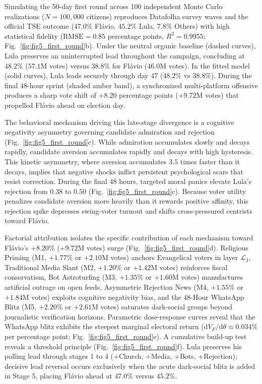 \documentclass[a4paper,fleqn]{cas-dc}
\begin{document}
Simulating the 50-day first round across 100 independent Monte Carlo realizations ($N = 100{,}000$ citizens) reproduces Datafolha survey waves and the official TSE outcome ($47.0\%$ Flávio, $45.2\%$ Lula, $7.8\%$ Others) with high statistical fidelity ($\mathrm{RMSE} = 0.85$ percentage points, $R^2 = 0.9955$; Fig.~\ref{fig:fig5_first_round}b). Under the neutral organic baseline (dashed curves), Lula preserves an uninterrupted lead throughout the campaign, concluding at $48.2\%$ ($57.1\mathrm{M}$ votes) versus $38.8\%$ for Flávio ($46.0\mathrm{M}$ votes). In the fitted model (solid curves), Lula leads securely through day 47 ($48.2\%$ vs $38.8\%$). During the final 48-hour sprint (shaded amber band), a synchronized multi-platform offensive produces a sharp vote shift of $+8.20$ percentage points ($+9.72\mathrm{M}$ votes) that propelled Flávio ahead on election day.

The behavioral mechanism driving this late-stage divergence is a cognitive negativity asymmetry governing candidate admiration and rejection (Fig.~\ref{fig:fig5_first_round}c). While admiration accumulates slowly and decays rapidly, candidate aversion accumulates rapidly and decays with high hysteresis. This kinetic asymmetry, where aversion accumulates $3.5$ times faster than it decays, implies that negative shocks inflict persistent psychological scars that resist correction. During the final 48 hours, targeted moral panics elevate Lula's rejection from $0.38$ to $0.50$ (Fig.~\ref{fig:fig5_first_round}c). Because voter utility penalizes candidate aversion more heavily than it rewards positive affinity, this rejection spike depresses swing-voter turnout and shifts cross-pressured centrists toward Flávio.

Factorial attribution isolates the specific contribution of each mechanism toward Flávio's $+8.20\%$ ($+9.72\mathrm{M}$ votes) surge (Fig.~\ref{fig:fig5_first_round}d). Religious Priming (M1, $+1.77\%$ or $+2.10\mathrm{M}$ votes) anchors Evangelical voters in layer $\mathcal{L}_3$, Traditional Media Slant (M2, $+1.20\%$ or $+1.42\mathrm{M}$ votes) reinforces fiscal conservatism, Bot Astroturfing (M3, $+1.35\%$ or $+1.60\mathrm{M}$ votes) manufactures artificial outrage on open feeds, Asymmetric Rejection News (M4, $+1.55\%$ or $+1.84\mathrm{M}$ votes) exploits cognitive negativity bias, and the 48-Hour WhatsApp Blitz (M5, $+2.20\%$ or $+2.61\mathrm{M}$ votes) saturates dark-social groups beyond journalistic verification horizons. Parametric dose-response curves reveal that the WhatsApp blitz exhibits the steepest marginal electoral return ($\mathrm{d}V_F/\mathrm{d}\theta \approx 0.034\%$ per percentage point; Fig.~\ref{fig:fig5_first_round}e). A cumulative build-up test reveals a threshold principle (Fig.~\ref{fig:fig5_first_round}f). Lula preserves his polling lead through stages 1 to 4 (+Church, +Media, +Bots, +Rejection); decisive lead reversal occurs exclusively when the acute dark-social blitz is added in Stage 5, placing Flávio ahead at $47.0\%$ versus $45.2\%$.
\end{document}
